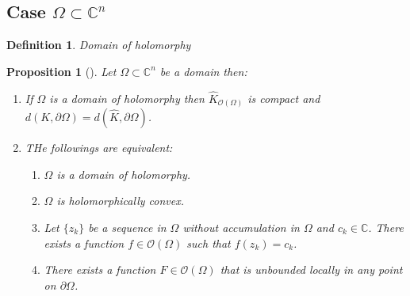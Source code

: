 \documentclass[11pt]{article}
\newtheorem{proposition}{Proposition}[theorem]
\newtheorem{definition}{Definition}
\begin{document}
\subsection{Case \(\Omega\subset \mathbb{C}^n\)}
\label{sec:orgc087ad0}
\begin{definition}
Domain of holomorphy
\end{definition}

\begin{proposition}[]
\label{prop:}
Let \(\Omega\subset \mathbb{C}^n\) be a domain then:
\begin{enumerate}
\item If \(\Omega\) is a domain of holomorphy then \(\hat K_{\mathcal{O}(\Omega)}\) is
compact and \(d(K, \partial \Omega) = d(\hat K,\partial\Omega)\).
\item THe followings are equivalent:
\begin{enumerate}
\item \(\Omega\) is a domain of holomorphy.
\item \(\Omega\) is holomorphically convex.
\item Let \(\{z_k\}\) be a sequence in \(\Omega\) without accumulation in \(\Omega\)
and \(c_k\in \mathbb{C}\). There exists a function \(f\in \mathcal{O}(\Omega)\)
such that \(f(z_k)=c_k\).
\item There exists a function \(F\in \mathcal{O}(\Omega)\) that is unbounded locally in
any point on \(\partial\Omega\).
\end{enumerate}
\end{enumerate}
\end{proposition}
\end{document}
